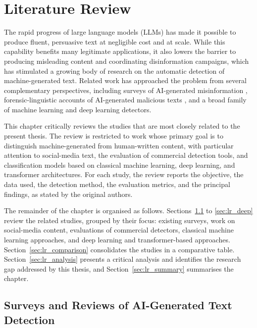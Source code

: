 \chapter{Literature Review}
\label{ch:literaturereview}

The rapid progress of large language models (LLMs) has made it possible to produce fluent, persuasive text at negligible cost and at scale. While this capability benefits many legitimate applications, it also lowers the barrier to producing misleading content \cite{zakaria2024} and coordinating disinformation campaigns, which has stimulated a growing body of research on the automatic detection of machine-generated text. Related work has approached the problem from several complementary perspectives, including surveys of AI-generated misinformation \cite{zakaria2024}, forensic-linguistic accounts of AI-generated malicious texts \cite{sousasilva2024}, and a broad family of machine learning and deep learning detectors.

This chapter critically reviews the studies that are most closely related to the present thesis. The review is restricted to work whose primary goal is to distinguish machine-generated from human-written content, with particular attention to social-media text, the evaluation of commercial detection tools, and classification models based on classical machine learning, deep learning, and transformer architectures. For each study, the review reports the objective, the data used, the detection method, the evaluation metrics, and the principal findings, as stated by the original authors.

The remainder of the chapter is organised as follows. Sections~\ref{sec:lr_surveys} to \ref{sec:lr_deep} review the related studies, grouped by their focus: existing surveys, work on social-media content, evaluations of commercial detectors, classical machine learning approaches, and deep learning and transformer-based approaches. Section~\ref{sec:lr_comparison} consolidates the studies in a comparative table. Section~\ref{sec:lr_analysis} presents a critical analysis and identifies the research gap addressed by this thesis, and Section~\ref{sec:lr_summary} summarises the chapter.

\section{Surveys and Reviews of AI-Generated Text Detection}
\label{sec:lr_surveys}

